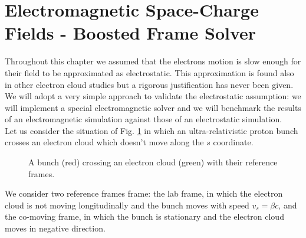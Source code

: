 \section{Electromagnetic Space-Charge Fields - Boosted Frame Solver}
\label{sec:boostedFrame}
Throughout this chapter we assumed that the electrons motion is slow enough for their field to be approximated as electrostatic. This approximation is found also in other electron cloud studies but a rigorous justification has never been given.
We will adopt a very simple approach to validate the electrostatic assumption: we will implement a special electromagnetic solver and we will benchmark the results of an electromagnetic simulation against those of an electrostatic simulation.\\
Let us consider the situation of Fig. \ref{fig:refFrames} in which an ultra-relativistic proton bunch crosses an electron cloud which doesn't move along the $s$ coordinate. 
\begin{figure}
    \centering
    
    \caption{A bunch (red) crossing an electron cloud (green) with their reference frames.}
    \label{fig:refFrames}
\end{figure}
We consider two reference frames frame: the lab frame, in which the electron cloud is not moving longitudinally and the bunch moves with speed $v_s = \beta c$, and the co-moving frame, in which the bunch is stationary and the electron cloud moves in negative direction.\\
